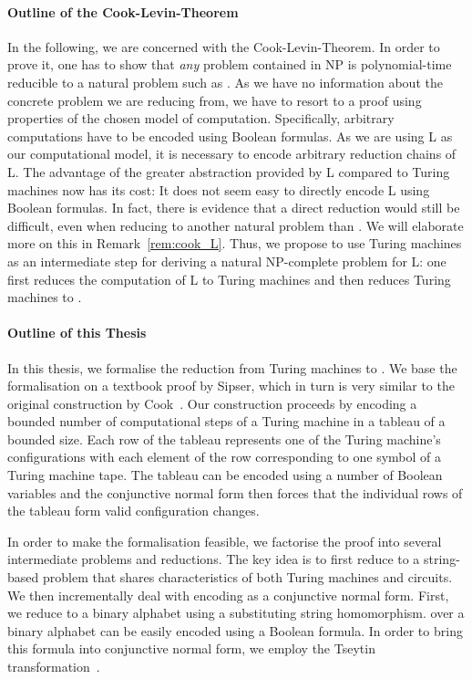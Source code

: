 \paragraph{Outline of the Cook-Levin-Theorem}
In the following, we are concerned with the Cook-Levin-Theorem.
In order to prove it, one has to show that \emph{any} problem contained in NP is polynomial-time reducible to a natural problem such as \SAT{}. 
As we have no information about the concrete problem we are reducing from, we have to resort to a proof using properties of the chosen model of computation. 
Specifically, arbitrary computations have to be encoded using Boolean formulas.
As we are using L as our computational model, it is necessary to encode arbitrary reduction chains of L. The advantage of the greater abstraction provided by L compared to Turing machines now has its cost: It does not seem easy to directly encode L using Boolean formulas. In fact, there is evidence that a direct reduction would still be difficult, even when reducing to another natural problem than \SAT{}. We will elaborate more on this in Remark~\ref{rem:cook_L}.
Thus, we propose to use Turing machines as an intermediate step for deriving a natural NP-complete problem for L: one first reduces the computation of L to Turing machines and then reduces Turing machines to \SAT{}. 

\paragraph{Outline of this Thesis}
In this thesis, we formalise the reduction from Turing machines to \SAT{}. We base the formalisation on a textbook proof by Sipser\cite{Sipser:TheoryofComputation}, which in turn is very similar to the original construction by Cook~\cite{cook_theorem}. Our construction proceeds by encoding a bounded number of computational steps of a Turing machine in a tableau of a bounded size. 
Each row of the tableau represents one of the Turing machine's configurations with each element of the row corresponding to one symbol of a Turing machine tape. The tableau can be encoded using a number of Boolean variables and the conjunctive normal form then forces that the individual rows of the tableau form valid configuration changes.

In order to make the formalisation feasible, we factorise the proof into several intermediate problems and reductions. The key idea is to first reduce to a string-based problem \PR{} that shares characteristics of both Turing machines and circuits. 
We then incrementally deal with encoding \PR{} as a conjunctive normal form. First, we reduce to a binary alphabet using a substituting string homomorphism. 
\PR{} over a binary alphabet can be easily encoded using a Boolean formula. In order to bring this formula into conjunctive normal form, we employ the Tseytin transformation~\cite{Tseitin1983}.

